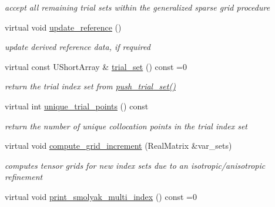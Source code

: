 \begin{DoxyCompactItemize}
\begin{DoxyCompactList}\small\item\em accept all remaining trial sets within the generalized sparse grid procedure \end{DoxyCompactList}\item 
virtual void \hyperlink{classPecos_1_1SparseGridDriver_a7b4ed98b79fff649e6f66629f8356542}{update\+\_\+reference} ()\label{classPecos_1_1SparseGridDriver_a7b4ed98b79fff649e6f66629f8356542}

\begin{DoxyCompactList}\small\item\em update derived reference data, if required \end{DoxyCompactList}\item 
virtual const U\+Short\+Array \& \hyperlink{classPecos_1_1SparseGridDriver_a850be68932eb543e77e375c791b9f097}{trial\+\_\+set} () const =0\label{classPecos_1_1SparseGridDriver_a850be68932eb543e77e375c791b9f097}

\begin{DoxyCompactList}\small\item\em return the trial index set from \hyperlink{classPecos_1_1SparseGridDriver_a0d967c54a2f89a28ac1c406a5aaaae07}{push\+\_\+trial\+\_\+set()} \end{DoxyCompactList}\item 
virtual int \hyperlink{classPecos_1_1SparseGridDriver_a3d8e458c7cf95eae26aa53a738844d89}{unique\+\_\+trial\+\_\+points} () const \label{classPecos_1_1SparseGridDriver_a3d8e458c7cf95eae26aa53a738844d89}

\begin{DoxyCompactList}\small\item\em return the number of unique collocation points in the trial index set \end{DoxyCompactList}\item 
virtual void \hyperlink{classPecos_1_1SparseGridDriver_af2bf445b9a8d1f418dc3519a3305b05f}{compute\+\_\+grid\+\_\+increment} (Real\+Matrix \&var\+\_\+sets)\label{classPecos_1_1SparseGridDriver_af2bf445b9a8d1f418dc3519a3305b05f}

\begin{DoxyCompactList}\small\item\em computes tensor grids for new index sets due to an isotropic/anisotropic refinement \end{DoxyCompactList}\item 
virtual void \hyperlink{classPecos_1_1SparseGridDriver_a32f63e3deb9e3ad93d88cd905c60bd29}{print\+\_\+smolyak\+\_\+multi\+\_\+index} () const =0\label{classPecos_1_1SparseGridDriver_a32f63e3deb9e3ad93d88cd905c60bd29}


\end{DoxyCompactItemize}
